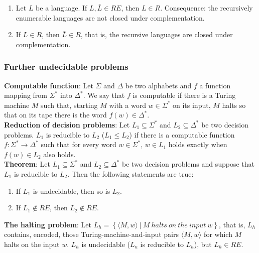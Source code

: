 \documentclass[margin=0px]{article}
\begin{document}
\begin{enumerate}
    \item	Let $L$ be a language. If $L, \bar{L} \in RE$, then $L \in R$. Consequence: the recursively enumerable
          languages are not closed under complementation.

    \item	If $L \in R$, then $\bar{L} \in R$, that is, the recursive languages are closed under complementation.
\end{enumerate}

\subsubsection{Further undecidable problems}

\noindent \textbf{Computable function}: Let $\Sigma$ and $\Delta$ be two alphabets and $f$ a function mapping from $\Sigma^{*}$
into $\Delta^{*}$. We say that $f$ is computable if there is a Turing machine $M$ such that,
starting $M$ with a word $w \in \Sigma^{*}$ on its input, $M$ halts so that on its tape there is the
word $f(w) \in \Delta^{*}$.\\

\noindent \textbf{Reduction of decision problems}: Let $L_{1} \subseteq \Sigma^{*}$ and $L_{2} \subseteq \Delta^{*}$
be two decision problems. $L_{1}$ is reducible to $L_{2}$ ($L_{1} \leq L_{2}$) if there is a
computable function $f : \Sigma^{*} \to \Delta^{*}$ such that for every word $w \in \Sigma^{*}$,
$w \in L_{1}$ holds exactly when $f(w) \in L_{2}$ also holds.\\

\noindent \textbf{Theorem}: Let $L_{1} \subseteq \Sigma^{*}$ and $L_{2} \subseteq \Delta^{*}$
be two decision problems and suppose that $L_{1}$ is reducible to $L_{2}$. Then the following statements are true:

\begin{enumerate}
    \item	If $L_{1}$ is undecidable, then so is $L_{2}$.

    \item	If $L_{1} \notin RE$, then $L_{2} \notin RE$.
\end{enumerate}

\noindent \textbf{The halting problem}: Let $L_{h} = \left\{\langle M, w \rangle \ |\ M \ halts \ on \ the \ input \ w \right\}$,
that is, $L_{h}$ contains, encoded, those Turing-machine-and-input pairs $\langle M, w \rangle$ for which $M$ halts on the input $w$.
$L_{h}$ is undecidable ($L_{u}$ is reducible to $L_{h}$), but $L_{h} \in RE$.\\
\end{document}
